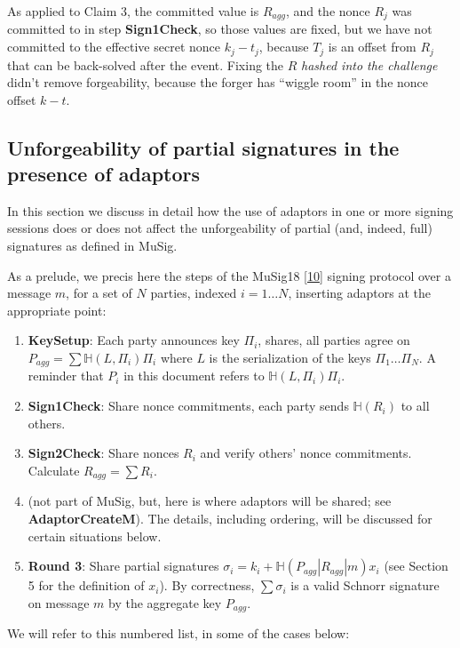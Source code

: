 \documentclass[10pt,a4paper]{article}
\begin{document}
As applied to Claim 3, the committed  value is $R_{agg}$, and the nonce $R_j$ was committed to in step \textbf{Sign1Check}, so those values are fixed, but we have not committed to the effective secret nonce $k_j-t_j$, because $T_j$ is an offset from $R_j$ that can be back-solved after the event. Fixing the $R$ \emph{hashed into the challenge} didn't remove forgeability, because the forger has ``wiggle room'' in the nonce offset $k - t$.

\subsection{Unforgeability of partial signatures in the presence of adaptors}

In this section we discuss in detail how the use of adaptors in one or more signing sessions does or does not affect the unforgeability of partial (and, indeed, full) signatures as defined in MuSig.

As a prelude, we precis here the steps of the MuSig18 {[}\protect\hyperlink{anchor-10}{10}{]} signing protocol over a message $m$, for a set of $N$ parties, indexed $i = 1 \ldots N$, inserting adaptors at the appropriate point:

\begin{enumerate}
\item \textbf{KeySetup}: Each party announces key $\Pi_i$, shares, all parties agree on $P_{agg} = \sum \mathbb{H}(L, \Pi_i)\Pi_i$ where $L$ is the serialization of the keys $\Pi_1 \ldots \Pi_N$. A reminder that $P_i$ in this document refers to $\mathbb{H}(L, \Pi_i)\Pi_i$.
\item \textbf{Sign1Check}: Share nonce commitments, each party sends $\mathbb{H}(R_i)$ to all others.
\item \textbf{Sign2Check}: Share nonces $R_i$ and verify others' nonce commitments. Calculate $R_{agg} = \sum R_i$.
\item (not part of MuSig, but, here is where adaptors will be shared; see \textbf{AdaptorCreateM}). The details, including ordering, will be discussed for certain situations below.
\item \textbf{Round 3}: Share partial signatures $\sigma_i = k_i + \mathbb{H}(P_{agg}|R_{agg}|m)x_i$ (see Section 5 for the definition of $x_i$). By correctness, $\sum \sigma_i$ is a valid Schnorr signature on message $m$ by the aggregate key $P_{agg}$.
\end{enumerate}

We will refer to this numbered list, in some of the cases below:
\end{document}
